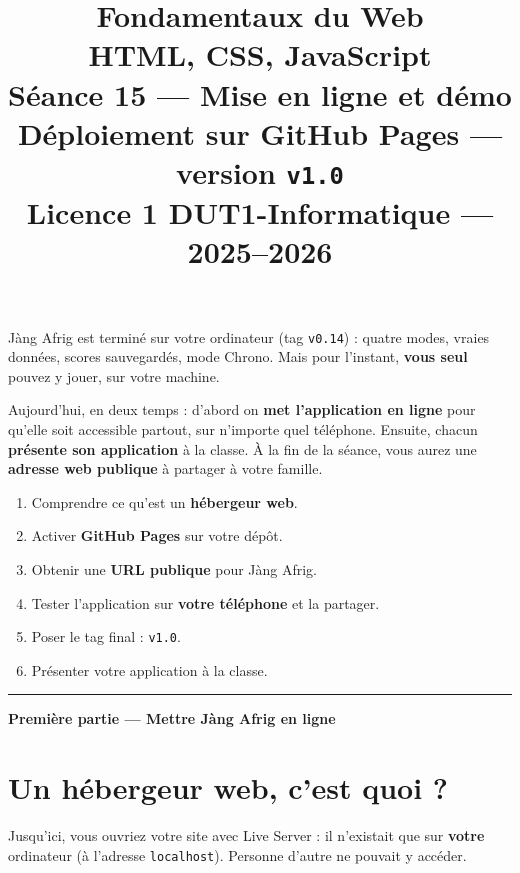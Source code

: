 \documentclass[11pt,a4paper]{article}
\title{%
\vspace{-1cm}
\textbf{\LARGE Fondamentaux du Web}\\
\textbf{\LARGE HTML, CSS, JavaScript}\\[0.8cm]
\textbf{\huge Séance 15 --- Mise en ligne et démo}\\[0.3cm]
\textbf{\Large Déploiement sur GitHub Pages --- version \texttt{v1.0}}\\[0.5cm]
\large Licence 1 DUT1-Informatique --- 2025--2026}
\date{}
\author{}
\newcommand{\code}[1]{\texttt{#1}}
\begin{document}
\maketitle
\thispagestyle{empty}

\begin{prereqbox}
Jàng Afrig est terminé sur votre ordinateur (tag \code{v0.14}) : quatre modes, vraies données, scores sauvegardés, mode Chrono. Mais pour l'instant, \textbf{vous seul} pouvez y jouer, sur votre machine.

\smallskip
Aujourd'hui, en deux temps : d'abord on \textbf{met l'application en ligne} pour qu'elle soit accessible partout, sur n'importe quel téléphone. Ensuite, chacun \textbf{présente son application} à la classe. À la fin de la séance, vous aurez une \textbf{adresse web publique} à partager à votre famille.
\end{prereqbox}

\begin{objectifbox}
\begin{enumerate}[leftmargin=*,noitemsep]
  \item Comprendre ce qu'est un \textbf{hébergeur web}.
  \item Activer \textbf{GitHub Pages} sur votre dépôt.
  \item Obtenir une \textbf{URL publique} pour Jàng Afrig.
  \item Tester l'application sur \textbf{votre téléphone} et la partager.
  \item Poser le tag final : \code{v1.0}.
  \item Présenter votre application à la classe.
\end{enumerate}
\end{objectifbox}

\tableofcontents
\bigskip\hrule\bigskip

\begin{center}\large\textbf{Première partie --- Mettre Jàng Afrig en ligne}\end{center}

\section{Un hébergeur web, c'est quoi ?}

Jusqu'ici, vous ouvriez votre site avec Live Server : il n'existait que sur \textbf{votre} ordinateur (à l'adresse \code{localhost}). Personne d'autre ne pouvait y accéder.
\end{document}
